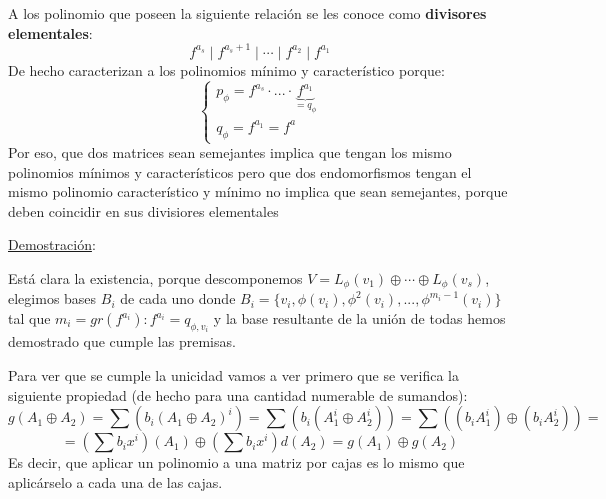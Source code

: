 \documentclass[10pt,a4paper,openright]{book}
\begin{document}
A los polinomio que poseen la siguiente relación se les conoce como \textbf{divisores elementales}:
$$f^{a_s}\mid f^{a_s +1} \mid \cdots \mid f^{a_2}\mid f^{a_1}$$
De hecho caracterizan a los polinomios mínimo y característico porque:
$$\begin{cases}p_\phi = f^{a_s}\cdot ... \cdot \underbrace{f^{a_1}}_{= q_\phi} \\ q_\phi = f^{a_1} = f^a\end{cases}$$
Por eso, que dos matrices sean semejantes implica que tengan los mismo polinomios mínimos y característicos pero que dos endomorfismos tengan el mismo polinomio característico y mínimo no implica que sean semejantes, porque deben coincidir en sus divisiores elementales

\underline{Demostración}:

Está clara la existencia, porque descomponemos $V=L_\phi(v_1)\oplus \cdots \oplus L_\phi(v_s)$, elegimos bases $B_i$ de cada uno donde $B_i=\{v_i, \phi(v_i), \phi^2(v_i), ..., \phi^{m_i-1}(v_i)\}$ tal que $m_i=gr(f^{a_i}): f^{a_i}=q_{\phi, v_i}$ y la base resultante de la unión de todas hemos demostrado que cumple las premisas.

Para ver que se cumple la unicidad vamos a ver primero que se verifica la siguiente propiedad (de hecho para una cantidad numerable de sumandos):
$$g(A_1\oplus A_2)=\sum \left(b_i (A_1\oplus A_2)^i\right)=\sum \left(b_i (A_1^i\oplus A_2^i)\right)=\sum \left((b_i A_1^i)\oplus (b_i A_2^i)\right)=$$
$$=\left(\sum b_i x^i\right)(A_1) \oplus \left(\sum b_i x^i\right)d (A_2)=g(A_1)\oplus g(A_2)$$
Es decir, que aplicar un polinomio a una matriz por cajas es lo mismo que aplicárselo a cada una de las cajas.
\end{document}
